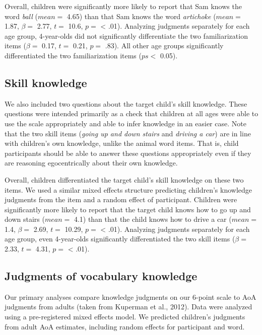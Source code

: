 \documentclass[10pt, letterpaper]{article}
\begin{document}
Overall, children were significantly more likely to report that Sam
knows the word \emph{ball} (\(mean =\) 4.65) than that Sam knows the
word \emph{artichoke} (\(mean =\) 1.87, \(\beta =\) 2.77, \(t =\) 10.6,
\(p =\) \textless{} .01). Analyzing judgments separately for each age
group, 4-year-olds did not significantly differentiate the two
familiarization items (\(\beta =\) 0.17, \(t =\) 0.21, \(p =\) .83). All
other age groups significantly differentiated the two familiarization
items (\(ps <\) 0.05).

\hypertarget{skill-knowledge}{%
\subsection{Skill knowledge}\label{skill-knowledge}}

We also included two questions about the target child's skill knowledge.
These questions were intended primarily as a check that children at all
ages were able to use the scale appropriately and able to infer
knowledge in an easier case. Note that the two skill items (\emph{going
up and down stairs} and \emph{driving a car}) are in line with
children's own knowledge, unlike the animal word items. That is, child
participants should be able to answer these questions appropriately even
if they are reasoning egocentrically about their own knowledge.

Overall, children differentiated the target child's skill knowledge on
these two items. We used a similar mixed effects structure predicting
children's knowledge judgments from the item and a random effect of
participant. Children were significantly more likely to report that the
target child knows how to go up and down stairs (\(mean =\) 4.1) than
that the child knows how to drive a car (\(mean =\) 1.4, \(\beta =\)
2.69, \(t =\) 10.29, \(p =\) \textless{} .01). Analyzing judgments
separately for each age group, even 4-year-olds significantly
differentiated the two skill items (\(\beta =\) 2.33, \(t =\) 4.31,
\(p =\) \textless{} .01).

\hypertarget{judgments-of-vocabulary-knowledge}{%
\subsection{Judgments of vocabulary
knowledge}\label{judgments-of-vocabulary-knowledge}}

Our primary analyses compare knowledge judgments on our 6-point scale to
AoA judgments from adults (taken from Kuperman et al., 2012). Data were
analyzed using a pre-registered mixed effects model. We predicted
children's judgments from adult AoA estimates, including random effects
for participant and word.
\end{document}
